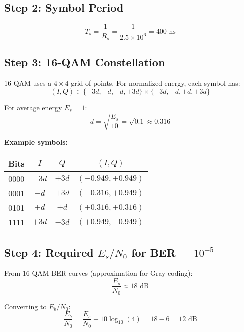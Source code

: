 \subsection*{Step 2: Symbol Period}

\begin{equation}
T_s = \frac{1}{R_s} = \frac{1}{2.5 \times 10^6} = 400 \text{ ns}
\end{equation}

\subsection*{Step 3: 16-QAM Constellation}

16-QAM uses a $4 \times 4$ grid of points. For normalized energy, each symbol has:
\begin{equation}
(I, Q) \in \{-3d, -d, +d, +3d\} \times \{-3d, -d, +d, +3d\}
\end{equation}

For average energy $E_s = 1$:
\begin{equation}
d = \sqrt{\frac{E_s}{10}} = \sqrt{0.1} \approx 0.316
\end{equation}

\textbf{Example symbols:}
\begin{center}
\begin{tabular}{@{}cccc@{}}
\toprule
Bits & $I$ & $Q$ & $(I, Q)$ \\
\midrule
0000 & $-3d$ & $+3d$ & $(-0.949, +0.949)$ \\
0001 & $-d$ & $+3d$ & $(-0.316, +0.949)$ \\
0101 & $+d$ & $+d$ & $(+0.316, +0.316)$ \\
1111 & $+3d$ & $-3d$ & $(+0.949, -0.949)$ \\
\bottomrule
\end{tabular}
\end{center}

\subsection*{Step 4: Required $E_s/N_0$ for BER $= 10^{-5}$}

From 16-QAM BER curves (approximation for Gray coding):
\begin{equation}
\frac{E_s}{N_0} \approx 18 \text{ dB}
\end{equation}

Converting to $E_b/N_0$:
\begin{equation}
\frac{E_b}{N_0} = \frac{E_s}{N_0} - 10\log_{10}(4) = 18 - 6 = 12 \text{ dB}
\end{equation}

